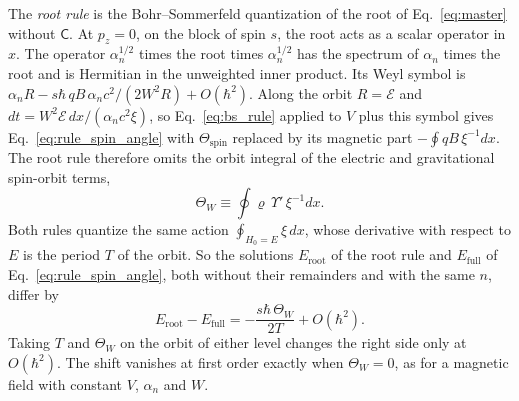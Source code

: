 \documentclass[aps,prd,onecolumn,tightenlines,nofootinbib,notitlepage,11pt,floatfix]{revtex4-2}
\theoremstyle{indentedtheorem}
\begin{document}
The \emph{root rule} is the Bohr--Sommerfeld quantization of the root of Eq.~\eqref{eq:master} without $\mathsf{C}$. At $p_z=0$, on the block of spin $s$, the root acts as a scalar operator in $x$. The operator $\alpha_n^{1/2}$ times the root times $\alpha_n^{1/2}$ has the spectrum of $\alpha_n$ times the root and is Hermitian in the unweighted inner product. Its Weyl symbol is $\alpha_nR-s\hbar\,qB\,\alpha_nc^2/(2W^2R)+O(\hbar^2)$. Along the orbit $R=\mathcal{E}$ and $dt=W^2\mathcal{E}\,dx/(\alpha_nc^2\xi)$, so Eq.~\eqref{eq:bs_rule} applied to $V$ plus this symbol gives Eq.~\eqref{eq:rule_spin_angle} with $\Theta_\text{spin}$ replaced by its magnetic part $-\oint qB\,\xi^{-1}dx$. The root rule therefore omits the orbit integral of the electric and gravitational spin-orbit terms,
\begin{equation*}
    \Theta_W \equiv \oint\varrho\,\Upsilon'\,\xi^{-1}dx .
\end{equation*}
Both rules quantize the same action $\oint_{H_0=E}\xi\,dx$, whose derivative with respect to $E$ is the period $T$ of the orbit. So the solutions $E_\text{root}$ of the root rule and $E_\text{full}$ of Eq.~\eqref{eq:rule_spin_angle}, both without their remainders and with the same $n$, differ by
\begin{equation}
    E_\text{root}-E_\text{full} = -\frac{s\hbar\,\Theta_W}{2T}+O(\hbar^2) .
    \label{eq:root_shift}
\end{equation}
Taking $T$ and $\Theta_W$ on the orbit of either level changes the right side only at $O(\hbar^2)$. The shift vanishes at first order exactly when $\Theta_W=0$, as for a magnetic field with constant $V$, $\alpha_n$ and $W$.
\end{document}

